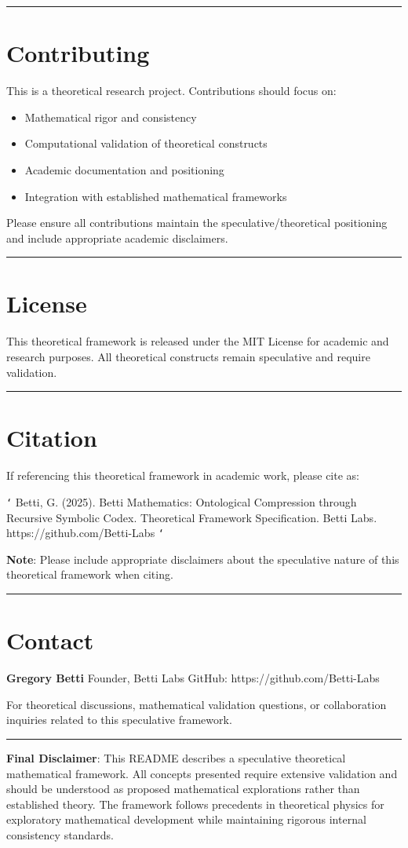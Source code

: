 \hrule

\section{Contributing}

This is a theoretical research project. Contributions should focus on:
\begin{itemize}
\item Mathematical rigor and consistency
\item Computational validation of theoretical constructs
\item Academic documentation and positioning
\item Integration with established mathematical frameworks
\end{itemize}

Please ensure all contributions maintain the speculative/theoretical positioning and include appropriate academic disclaimers.

\hrule

\section{License}

This theoretical framework is released under the MIT License for academic and research purposes. All theoretical constructs remain speculative and require validation.

\hrule

\section{Citation}

If referencing this theoretical framework in academic work, please cite as:

\texttt{`}
Betti, G. (2025). Betti Mathematics: Ontological Compression through Recursive Symbolic Codex. 
Theoretical Framework Specification. Betti Labs. https://github.com/Betti-Labs
\texttt{`}

\textbf{Note}: Please include appropriate disclaimers about the speculative nature of this theoretical framework when citing.

\hrule

\section{Contact}

\textbf{Gregory Betti}  
Founder, Betti Labs  
GitHub: https://github.com/Betti-Labs

For theoretical discussions, mathematical validation questions, or collaboration inquiries related to this speculative framework.

\hrule

\textbf{Final Disclaimer}: This README describes a speculative theoretical mathematical framework. All concepts presented require extensive validation and should be understood as proposed mathematical explorations rather than established theory. The framework follows precedents in theoretical physics for exploratory mathematical development while maintaining rigorous internal consistency standards.